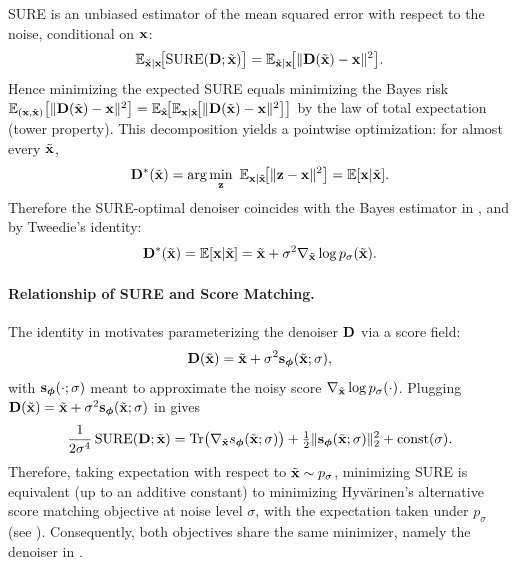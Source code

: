 SURE is an unbiased estimator of the mean squared error with respect to the noise, conditional on ${\mathbf{x}}$:
\[
\mathbb{E}_{\tilde{{\mathbf{x}}}| {\mathbf{x}}}\!\big[\mathrm{SURE}({\mathbf{D}}; \tilde{{\mathbf{x}}})\big]
=
\mathbb{E}_{\tilde{{\mathbf{x}}}| {\mathbf{x}}}\!\big[\|{\mathbf{D}}(\tilde{{\mathbf{x}}})-{\mathbf{x}}\|^2\big].
\]
Hence minimizing the expected SURE equals minimizing the Bayes risk
$\mathbb{E}_{({\mathbf{x}}, \tilde{{\mathbf{x}}})}\big[\|{\mathbf{D}}(\tilde{{\mathbf{x}}})-{\mathbf{x}}\|^2\big]
=\mathbb{E}_{\tilde{{\mathbf{x}}}}\!\big[\mathbb{E}_{{\mathbf{x}}| \tilde{{\mathbf{x}}}}\!\big[\|{\mathbf{D}}(\tilde{{\mathbf{x}}})-{\mathbf{x}}\|^2\big]\big]$ by the law of total expectation (tower property). This decomposition yields a pointwise optimization: for almost every $\tilde{{\mathbf{x}}}$,
\[
{\mathbf{D}}^*(\tilde{{\mathbf{x}}})
=\arg\min_{\mathbf z}\ \mathbb{E}_{{\mathbf{x}}| \tilde{{\mathbf{x}}}}\!\big[\|\mathbf z-{\mathbf{x}}\|^2\big]
=\mathbb{E}[{\mathbf{x}}| \tilde{{\mathbf{x}}}].
\]
Therefore the SURE-optimal denoiser coincides with the Bayes estimator in , and by Tweedie’s identity:
\begin{align}\label{eq:sure-tweedie-denoiser}
    {\mathbf{D}}^*(\tilde{{\mathbf{x}}})=\mathbb{E}[{\mathbf{x}}| \tilde{{\mathbf{x}}}]=\tilde{{\mathbf{x}}}+\sigma^2\nabla_{\tilde{{\mathbf{x}}}}\log p_\sigma(\tilde{{\mathbf{x}}}).
\end{align}




\paragraph{Relationship of SURE and Score Matching.}
The identity in  motivates parameterizing the denoiser ${\mathbf{D}}$ via a score field:
\[
{\mathbf{D}}(\tilde{{\mathbf{x}}})=\tilde{{\mathbf{x}}}+\sigma^2{\mathbf{s}}_{\bm\phi}(\tilde{{\mathbf{x}}};\sigma),
\]
with ${\mathbf{s}}_{\bm\phi}(\cdot;\sigma)$ meant to approximate the noisy score
$\nabla_{\tilde{{\mathbf{x}}}}\log p_\sigma(\cdot)$.
Plugging  ${\mathbf{D}}(\tilde{{\mathbf{x}}})=\tilde{{\mathbf{x}}}+\sigma^2 {\mathbf{s}}_{\bm\phi}(\tilde{{\mathbf{x}}};\sigma)$ in  gives
\[
\frac{1}{2\sigma^4}\,\mathrm{SURE}({\mathbf{D}};\tilde{{\mathbf{x}}})
=
\operatorname{Tr}\!\big(\nabla_{\tilde{{\mathbf{x}}}} s_{\bm\phi}(\tilde{{\mathbf{x}}};\sigma)\big)
+\tfrac12\|{\mathbf{s}}_{\bm\phi}(\tilde{{\mathbf{x}}};\sigma)\|_2^2
+\text{const}(\sigma).
\]
Therefore, taking expectation with respect to $\tilde{{\mathbf{x}}}\sim p_\sigma$, minimizing SURE is
equivalent (up to an additive constant) to minimizing Hyv\"arinen’s alternative
score matching objective at noise level $\sigma$, with the expectation taken under $p_\sigma$ (see ).
Consequently, both objectives share the same minimizer, namely the denoiser in .



